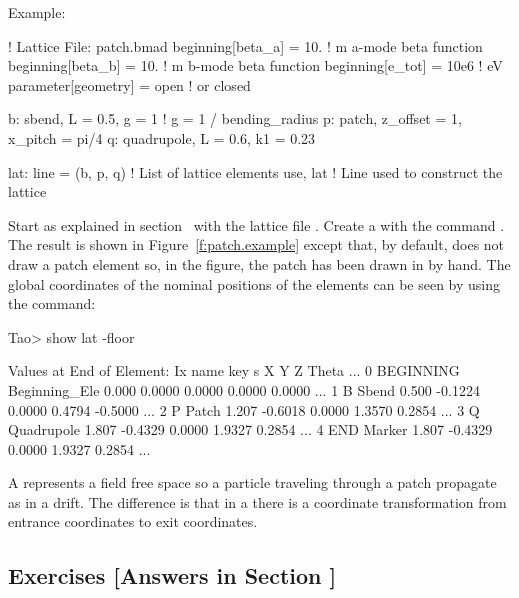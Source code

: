 \documentclass{hitec}     %
\begin{document}
{\newpage

Example:
\begin{code}
! Lattice File: patch.bmad
beginning[beta_a] = 10.   ! m  a-mode beta function
beginning[beta_b] = 10.   ! m  b-mode beta function
beginning[e_tot] = 10e6   ! eV
parameter[geometry] = open  ! or closed

b: sbend, L = 0.5, g = 1    ! g = 1 / bending_radius
p: patch, z_offset = 1, x_pitch = pi/4
q: quadrupole, L = 0.6, k1 = 0.23

lat: line = (b, p, q)   ! List of lattice elements
use, lat                ! Line used to construct the lattice
\end{code}

Start \tao as explained in section~ with the lattice file . Create a
 with the command . The result is shown in
Figure~\ref{f:patch.example} except that, by default, \tao does not draw a patch element so, in the
figure, the patch has been drawn in by hand. The global coordinates of the nominal positions of the
elements can be seen by using the  command:
\begin{code}
Tao> show lat -floor

      Values at End of Element:
Ix  name      key               s          X         Y         Z     Theta ...
 0  BEGINNING Beginning_Ele  0.000    0.0000    0.0000    0.0000    0.0000 ...
 1  B         Sbend          0.500   -0.1224    0.0000    0.4794   -0.5000 ...
 2  P         Patch          1.207   -0.6018    0.0000    1.3570    0.2854 ...
 3  Q         Quadrupole     1.807   -0.4329    0.0000    1.9327    0.2854 ...
 4  END       Marker         1.807   -0.4329    0.0000    1.9327    0.2854 ...
\end{code}

A  represents a field free space so a particle traveling through a patch propagate as in a
drift. The difference is that in a  there is a coordinate transformation from entrance
coordinates to exit coordinates.

\subsection{Exercises [Answers in Section ]}
\label{s:coords.ex}

}
\end{document}
